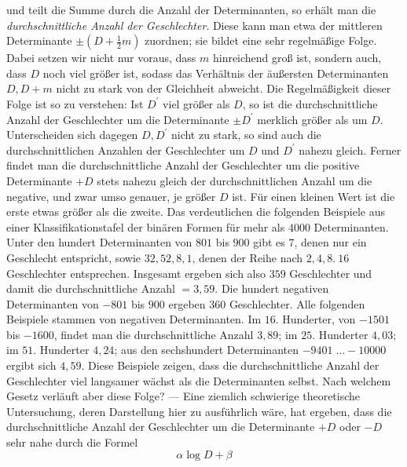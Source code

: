 und teilt die Summe durch die Anzahl der Determinanten, so erhält man die \textit{durchschnittliche Anzahl der Geschlechter}. Diese kann man etwa der mittleren Determinante \(\pm(D+\frac12m)\) zuordnen; sie bildet eine sehr regelmäßige Folge. Dabei setzen wir nicht nur voraus, dass \(m\) hinreichend groß ist, sondern auch, dass \(D\) noch viel größer ist, sodass das Verhältnis der äußersten Determinanten \(D,D+m\) nicht zu stark von der Gleichheit abweicht. Die Regelmäßigkeit dieser Folge ist so zu verstehen: Ist \(D^\prime\) viel größer als \(D\), so ist die durchschnittliche Anzahl der Geschlechter um die Determinante \(\pm D^\prime\) merklich größer als um \(D\). Unterscheiden sich dagegen \(D,D^\prime\) nicht zu stark, so sind auch die durchschnittlichen Anzahlen der Geschlechter um \(D\) und \(D^\prime\) nahezu gleich. Ferner findet man die durchschnittliche Anzahl der Geschlechter um die positive Determinante \(+D\) stets nahezu gleich der durchschnittlichen Anzahl um die negative, und zwar umso genauer, je größer \(D\) ist. Für einen kleinen Wert ist die erste etwas größer als die zweite. Das verdeutlichen die folgenden Beispiele aus einer Klassifikationstafel der binären Formen für mehr als \(4000\) Determinanten. Unter den hundert Determinanten von \(801\) bis \(900\) gibt es \(7\), denen nur ein Geschlecht entspricht, sowie \(32,52,8,1\), denen der Reihe nach \(2,4,8.\ 16\) Geschlechter entsprechen. Insgesamt ergeben sich also \(359\) Geschlechter und damit die durchschnittliche Anzahl \(=3{,}59\). Die hundert negativen Determinanten von \(-801\) bis \(900\) ergeben \(360\) Geschlechter. Alle folgenden Beispiele stammen von negativen Determinanten. Im \(16\). Hunderter, von \(-1501\) bis \(-1600\), findet man die durchschnittliche Anzahl \(3{,}89\); im \(25\). Hunderter \(4{,}03\); im \(51\). Hunderter \(4{,}24\); aus den sechshundert Determinanten \(-9401\;\ldots -10000\) ergibt sich \(4{,}59\). Diese Beispiele zeigen, dass die durchschnittliche Anzahl der Geschlechter viel langsamer wächst als die Determinanten selbst. Nach welchem Gesetz verläuft aber diese Folge? — Eine ziemlich schwierige theoretische Untersuchung, deren Darstellung hier zu ausführlich wäre, hat ergeben, dass die durchschnittliche Anzahl der Geschlechter um die Determinante \(+D\) oder \(-D\) sehr nahe durch die Formel
\[\alpha\log D+\beta\]

